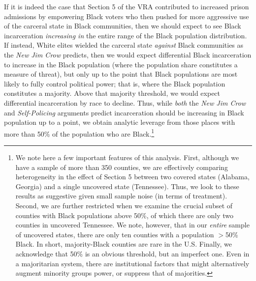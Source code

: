 \documentclass[12pt]{article}
\begin{document}
If it is indeed the case that Section 5 of the VRA contributed to increased prison admissions by empowering Black voters who then pushed for more aggressive use of the carceral state in Black communities, then we should expect to see Black incarceration \emph{increasing in} the entire range of the Black population distribution.  If instead, White elites wielded the carceral state \emph{against} Black communities as the \emph{New Jim Crow} predicts, then we would expect differential Black incarceration to increase in the Black population (where the population share constitutes a measure of threat), but only up to the point that Black populations are most likely to fully control political power; that is, where the Black population constitutes a majority.  Above that majority threshold, we would expect differential incarceration by race to decline.  Thus, while \emph{both} the \emph{New Jim Crow} and \emph{Self-Policing} arguments predict incarceration should be increasing in Black population up to a point, we obtain analytic leverage from those places with more than 50\% of the population who are Black.\footnote{We note here a few important features of this analysis.  First, although we have a sample of more than 350 counties, we are effectively comparing heterogeneity in the effect of Section 5 between two covered states (Alabama, Georgia) and a single uncovered state (Tennessee).  Thus, we look to these results as suggestive given small sample noise (in terms of treatment).  Second, we are further restricted when we examine the crucial subset of counties with Black populations above 50\%, of which there are only two counties in uncovered Tennessee.  We note, however, that in our \emph{entire} sample of uncovered states, there are only ten counties with a population $>$50\% Black.  In short, majority-Black counties are rare in the U.S. Finally, we acknowledge that 50\% is an obvious threshold, but an imperfect one.  Even in a majoritarian system, there are institutional factors that might alternatively augment minority groups power, or suppress that of majorities.}
\end{document}
